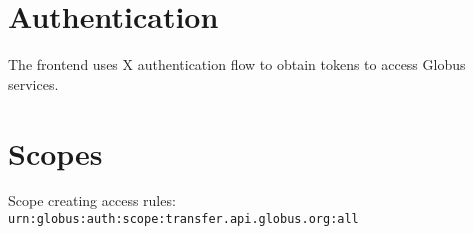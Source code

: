
\section{Authentication}

The frontend uses X authentication flow to obtain tokens to access Globus services.

\section{Scopes}

Scope creating access rules: \texttt{urn:globus:auth:scope:transfer.api.globus.org:all}
